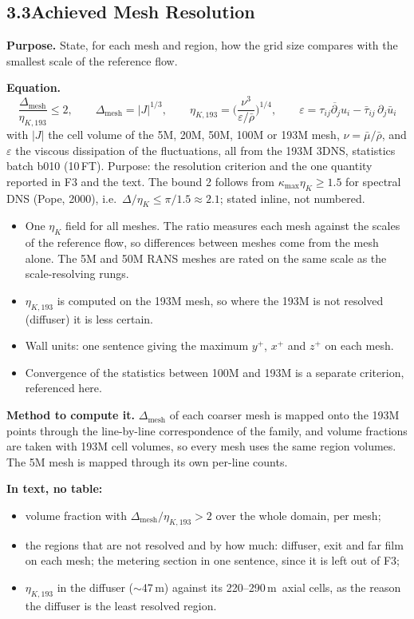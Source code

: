 \documentclass[10pt]{article}
\newcommand{\um}{\textmu m}
\newcommand{\deta}{\Delta_{\mathrm{mesh}}/\eta_{K,193}}
\begin{document}
\subsection*{3.3\quad Achieved Mesh Resolution}
\textbf{Purpose.} State, for each mesh and region, how the grid size compares with the smallest scale of the
reference flow.

\textbf{Equation.}
\begin{equation}
\frac{\Delta_{\mathrm{mesh}}}{\eta_{K,193}}\le2,\qquad \Delta_{\mathrm{mesh}}=|J|^{1/3},\qquad
\eta_{K,193}=\Big(\frac{\nu^3}{\varepsilon/\bar\rho}\Big)^{1/4},\qquad
\varepsilon=\overline{\tau_{ij}\partial_ju_i}-\bar\tau_{ij}\,\partial_j\bar u_i
\tag{E8}
\end{equation}
with $|J|$ the cell volume of the 5M, 20M, 50M, 100M or 193M mesh, $\nu=\bar\mu/\bar\rho$, and $\varepsilon$ the
viscous dissipation of the fluctuations, all from the 193M 3DNS, statistics batch b010 (10\,FT).
Purpose: the resolution criterion and the one quantity reported in F3 and the text. The bound 2 follows from
$\kappa_{\max}\eta_K\ge1.5$ for spectral DNS (Pope, 2000), i.e.\ $\Delta/\eta_K\le\pi/1.5\approx2.1$; stated
inline, not numbered.
\begin{itemize}
\item One $\eta_K$ field for all meshes. The ratio measures each mesh against the scales of the reference flow,
  so differences between meshes come from the mesh alone. The 5M and 50M RANS meshes are rated on the same
  scale as the scale-resolving rungs.
\item $\eta_{K,193}$ is computed on the 193M mesh, so where the 193M is not resolved (diffuser) it is
  less certain.
\item Wall units: one sentence giving the maximum $y^+$, $x^+$ and $z^+$ on each mesh.
\item Convergence of the statistics between 100M and 193M is a separate criterion, referenced here.
\end{itemize}

\textbf{Method to compute it.} $\Delta_{\mathrm{mesh}}$ of each coarser mesh is mapped
onto the 193M points through the line-by-line correspondence of the family, and volume fractions are taken with
193M cell volumes, so every mesh uses the same region volumes. The 5M mesh is mapped through its own per-line
counts.

\textbf{In text, no table:}
\begin{itemize}
\item volume fraction with $\deta>2$ over the whole domain, per mesh;
\item the regions that are not resolved and by how much: diffuser, exit and far film on each mesh; the metering
  section in one sentence, since it is left out of F3;
\item $\eta_{K,193}$ in the diffuser ($\sim$47\,\um) against its 220--290\,\um\ axial cells, as the reason the
  diffuser is the least resolved region.
\end{itemize}
\end{document}
